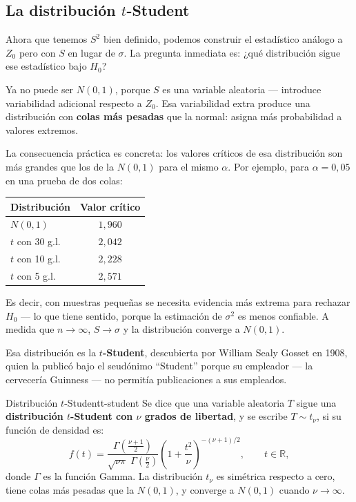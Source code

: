 \documentclass[12pt, a4paper]{book}
\numberwithin{equation}{chapter}
\begin{document}
\subsection{La distribuci\'{o}n $t$-Student}

Ahora que tenemos $S^2$ bien definido, podemos
construir el estad\'{i}stico an\'{a}logo a $Z_0$
pero con $S$ en lugar de $\sigma$. La pregunta
inmediata es: ¿qu\'{e} distribuci\'{o}n sigue
ese estad\'{i}stico bajo $H_0$?

Ya no puede ser $N(0,1)$, porque $S$ es una
variable aleatoria --- introduce variabilidad
adicional respecto a $Z_0$. Esa variabilidad
extra produce una distribuci\'{o}n con
\textbf{colas m\'{a}s pesadas} que la normal:
asigna m\'{a}s probabilidad a valores extremos.

La consecuencia pr\'{a}ctica es concreta: los
valores cr\'{i}ticos de esa distribuci\'{o}n
son m\'{a}s grandes que los de la $N(0,1)$
para el mismo $\alpha$. Por ejemplo, para
$\alpha = 0{,}05$ en una prueba de dos colas:
\begin{center}
	\begin{tabular}{lc}
		\toprule
		\textbf{Distribuci\'{o}n} &
		\textbf{Valor cr\'{i}tico} \\
		\midrule
		$N(0,1)$            & $1{,}960$ \\
		$t$ con 30 g.l.     & $2{,}042$ \\
		$t$ con 10 g.l.     & $2{,}228$ \\
		$t$ con 5 g.l.      & $2{,}571$ \\
		\bottomrule
	\end{tabular}
\end{center}
Es decir, con muestras peque\~{n}as se necesita
evidencia m\'{a}s extrema para rechazar $H_0$
--- lo que tiene sentido, porque la estimaci\'{o}n
de $\sigma^2$ es menos confiable. A medida que
$n \to \infty$, $S \to \sigma$ y la distribuci\'{o}n
converge a $N(0,1)$.

Esa distribuci\'{o}n es la \textbf{$t$-Student},
descubierta por William Sealy Gosset en 1908,
quien la public\'{o} bajo el seud\'{o}nimo
``Student'' porque su empleador --- la cervecer\'{i}a
Guinness --- no permit\'{i}a publicaciones a
sus empleados.

\begin{definicion}{Distribuci\'{o}n
		$t$-Student}{t-student}
	Se dice que una variable aleatoria $T$
	sigue una \textbf{distribuci\'{o}n
		$t$-Student con $\nu$ grados de libertad},
	y se escribe $T \sim t_{\nu}$, si su
	funci\'{o}n de densidad es:
	\[
	f(t) = \frac{\Gamma\!\left(
		\frac{\nu+1}{2}\right)}
	{\sqrt{\nu\pi}\;
		\Gamma\!\left(\frac{\nu}{2}\right)}
	\left(1 + \frac{t^2}{\nu}
	\right)^{-(\nu+1)/2},
	\qquad t \in \mathbb{R},
	\]
	donde $\Gamma$ es la funci\'{o}n Gamma.
	La distribuci\'{o}n $t_\nu$ es sim\'{e}trica
	respecto a cero, tiene colas m\'{a}s pesadas
	que la $N(0,1)$, y converge a $N(0,1)$
	cuando $\nu \to \infty$.
\end{definicion}
\end{document}
